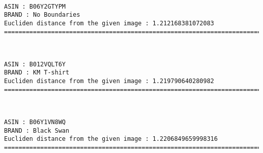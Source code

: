 \documentclass[11pt]{article}
\begin{document}
    \begin{center}
    \end{center}
    { \hspace*{\fill} \\}
    
    \begin{Verbatim}[commandchars=\\\{\}]
ASIN : B06Y2GTYPM
BRAND : No Boundaries
Eucliden distance from the given image : 1.212168381072083
=============================================================================================================================

    \end{Verbatim}

    \begin{center}
    \end{center}
    { \hspace*{\fill} \\}
    
    \begin{Verbatim}[commandchars=\\\{\}]
ASIN : B012VQLT6Y
BRAND : KM T-shirt
Eucliden distance from the given image : 1.219790640280982
=============================================================================================================================

    \end{Verbatim}

    \begin{center}
    \end{center}
    { \hspace*{\fill} \\}
    
    \begin{Verbatim}[commandchars=\\\{\}]
ASIN : B06Y1VN8WQ
BRAND : Black Swan
Eucliden distance from the given image : 1.2206849659998316
=============================================================================================================================

    \end{Verbatim}

    \begin{center}
    \end{center}
    { \hspace*{\fill} \\}
    
\end{document}
